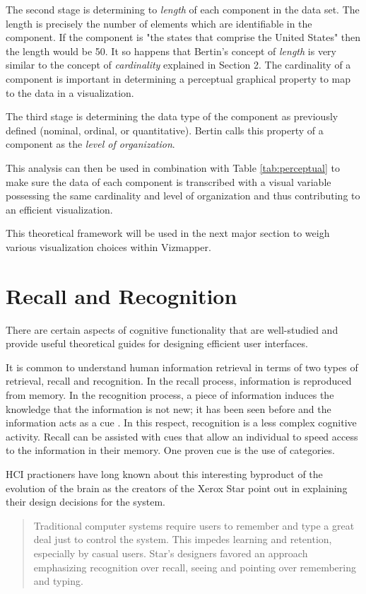 The second stage is determining to \emph{length} of each component in the data set. The length is precisely the number of elements which are identifiable in the component. If the component is "the states that comprise the United States" then the length would be 50. It so happens that Bertin's concept of \emph{length} is very similar to the concept of \emph{cardinality} explained in Section 2. The cardinality of a component is important in determining a perceptual graphical property to map to the data in a visualization.

The third stage is determining the data type of the component as previously defined (nominal, ordinal, or quantitative). Bertin calls this property of a component as the \emph{level of organization}.

This analysis can then be used in combination with Table \ref{tab:perceptual} to make sure the data of each component is transcribed with a visual variable possessing the same cardinality and level of organization and thus contributing to an efficient visualization.

This theoretical framework will be used in the next major section to weigh various visualization choices within Vizmapper.

\section{Recall and Recognition}

There are certain aspects of cognitive functionality that are well-studied and provide useful theoretical guides for designing efficient user interfaces.

It is common to understand human information retrieval in terms of two types of retrieval, recall and recognition. In the recall process, information is reproduced from memory. In the recognition process, a piece of information induces the knowledge that the information is not new; it has been seen before and the information acts as a cue \cite{hci1998}. In this respect, recognition is a less complex cognitive activity. Recall can be assisted with cues that allow an individual to speed access to the information in their memory. One proven cue is the use of categories.

HCI practioners have long known about this interesting byproduct of the evolution of the brain as the creators of the Xerox Star point out in explaining their design decisions for the system.

\begin{quote}
Traditional computer systems require users to remember and type a great deal just to control the system. This impedes learning and retention, especially by casual users. Star's designers favored an approach emphasizing recognition over recall, seeing and pointing over remembering and typing. \cite{xeroxstar1989}
\end{quote}

